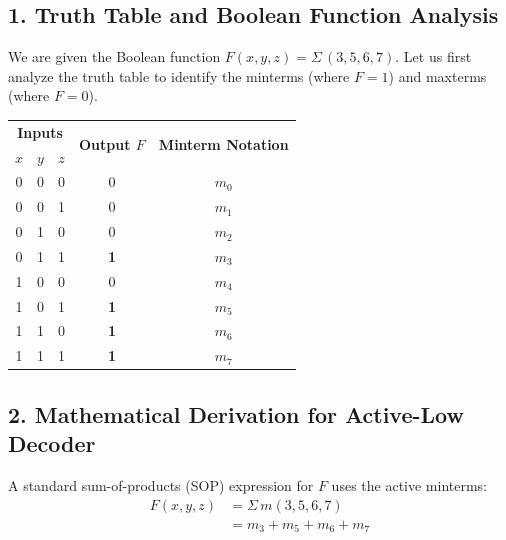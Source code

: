 \documentclass[12pt,a3paper]{article}
\begin{document}
\begin{enumerate}
\begin{tcolorbox}[enhanced,breakable,ansbox,colback=cD!4,colframe=cD,boxrule=0.8pt,arc=5pt,title={\textbf{Answer}},fonttitle=\bfseries\color{white},colbacktitle=cD]

\subsection*{1. Truth Table and Boolean Function Analysis}

We are given the Boolean function $F(x, y, z) = \Sigma\,(3, 5, 6, 7)$. Let us first analyze the truth table to identify the minterms (where $F=1$) and maxterms (where $F=0$).

\begin{center}
\renewcommand{\arraystretch}{1.2}
\begin{tabular}{ccc|c|c}
\toprule
\multicolumn{3}{c|}{\textbf{Inputs}} & \multirow{2}{*}{\textbf{Output $F$}} & \multirow{2}{*}{\textbf{Minterm Notation}} \\
$x$ & $y$ & $z$ & & \\
\midrule
0 & 0 & 0 & 0 & $m_0$ \\
0 & 0 & 1 & 0 & $m_1$ \\
0 & 1 & 0 & 0 & $m_2$ \\
0 & 1 & 1 & \textcolor{cD}{\textbf{1}} & \textcolor{cD}{\textbf{$m_3$}} \\
1 & 0 & 0 & 0 & $m_4$ \\
1 & 0 & 1 & \textcolor{cD}{\textbf{1}} & \textcolor{cD}{\textbf{$m_5$}} \\
1 & 1 & 0 & \textcolor{cD}{\textbf{1}} & \textcolor{cD}{\textbf{$m_6$}} \\
1 & 1 & 1 & \textcolor{cD}{\textbf{1}} & \textcolor{cD}{\textbf{$m_7$}} \\
\bottomrule
\end{tabular}
\end{center}

\subsection*{2. Mathematical Derivation for Active-Low Decoder}

A standard sum-of-products (SOP) expression for $F$ uses the active minterms:
\begin{align*}
    F(x, y, z) &= \Sigma\,m(3, 5, 6, 7) \\
               &= m_3 + m_5 + m_6 + m_7
\end{align*}


\end{tcolorbox}
\end{enumerate}
\end{document}
